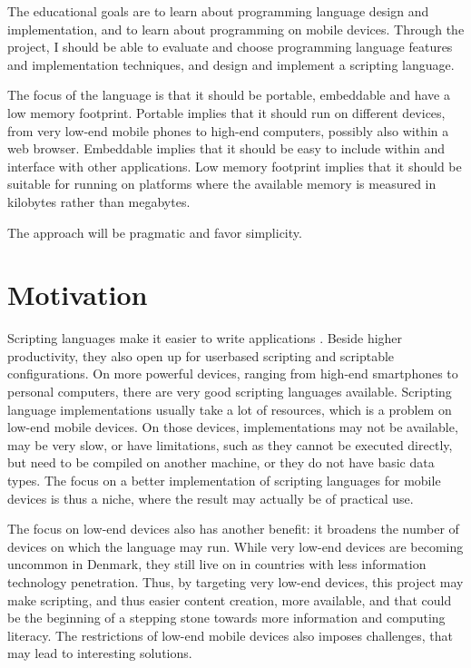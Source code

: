 \documentclass[11pt]{report}
\begin{document}
\begin{comment}
The motivation is that a scripting language makes it is easier to make applications for mobile 
devices, and that existing freely available scripting languages
are very limited, slow, or simply does not run on the low-end mobile devices.
\end{comment}

    The educational goals are to learn about programming language design and
implementation, and to learn about programming on mobile devices. Through the
project, I should be able to evaluate and choose programming language features
and implementation techniques, and design and implement a scripting language.

    The focus of the language is that it should be portable, embeddable and have
a low memory footprint. Portable implies that it should run on different devices,
from very low-end mobile phones to high-end computers, possibly also within a web browser. 
Embeddable implies that it should be easy to include within and interface with
other applications. Low memory footprint implies that it should be suitable for
running on platforms where the available memory is measured in kilobytes rather
than megabytes. 

    The approach will be pragmatic and favor simplicity.

\section{Motivation}
Scripting languages make it easier to write applications \cite{scripting-ousterhout}. Beside higher productivity, they also open up for userbased scripting and scriptable configurations.
On more powerful devices, ranging from high-end smartphones to personal computers, there are very good scripting languages available.
Scripting language implementations usually take a lot of resources, which is a problem on low-end mobile devices. On those devices, implementations may not be available, may be very slow, or have limitations, such as they cannot be executed directly, but need to be compiled on another machine, or they do not have basic data types.
The focus on a better implementation of scripting languages for mobile devices is thus a niche, where the result may actually be of practical use.

The focus on low-end devices also has another benefit:
it broadens the number of devices on which the language may run.
While very low-end devices are becoming uncommon in Denmark,
they still live on in countries with less information technology penetration.
Thus,  by targeting very low-end devices, 
this project may make scripting, and thus easier content creation,
more available,
and that could be the beginning of a stepping stone 
towards more information and computing literacy.
The restrictions of low-end mobile devices also imposes challenges, that may lead to interesting solutions.
\end{document}
